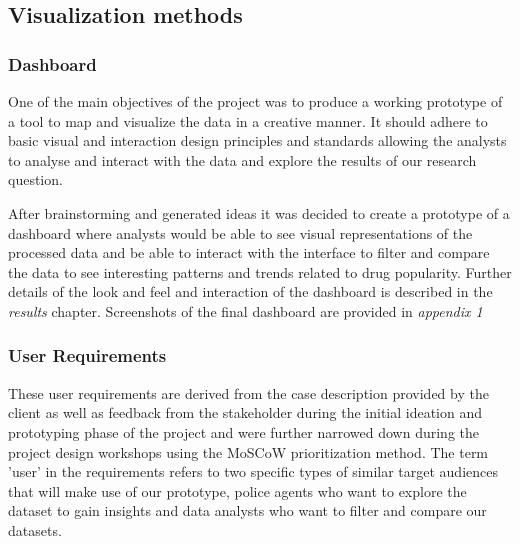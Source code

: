 \subsection{Visualization methods}

\subsubsection{Dashboard}

One of the main objectives of the project was to produce a working prototype of a tool to map and visualize the data in a creative manner. It should adhere to basic visual and interaction design principles and standards allowing the analysts to analyse and interact with the data and explore the results of our research question.

After brainstorming and generated ideas it was decided to create a prototype of a dashboard where analysts would be able to see visual representations of the processed data and be able to interact with the interface to filter and compare the data to see interesting patterns and trends related to drug popularity. Further details of the look and feel and interaction of the dashboard is described in the \textit{results} chapter. Screenshots of the final dashboard are provided in \textit{appendix 1}

\subsubsection{User Requirements}

These user requirements are derived from the case description provided by the client as well as feedback from the stakeholder during the initial ideation and prototyping phase of the project and were further narrowed down during the project design workshops using the MoSCoW prioritization method. The term 'user' in the requirements refers to two specific types of similar target audiences that will make use of our prototype, police agents who want to explore the dataset to gain insights and data analysts who want to filter and compare our datasets.

